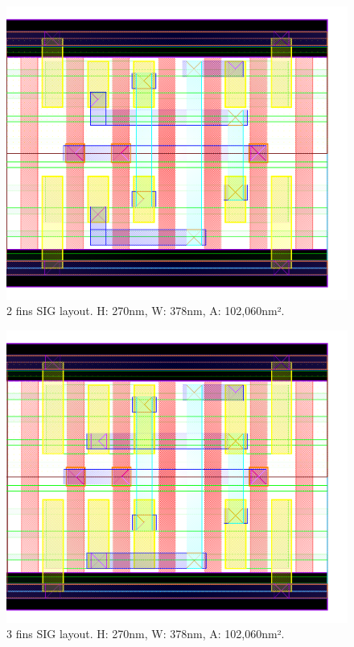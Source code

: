 \documentclass[pgmicro,diss,english]{iiufrgs}
\begin{document}
\begin{figure}[]
\centering
\includegraphics[width=\textwidth,height=\textheight,keepaspectratio]{SIG2F.png}
\caption{2 fins SIG layout. H: 270nm, W: 378nm, A: 102,060nm².}
\label{fig:SIG2F}
\end{figure}

\begin{figure}[]
\centering
\includegraphics[width=\textwidth,height=\textheight,keepaspectratio]{SIG3F.png}
\caption{3 fins SIG layout. H: 270nm, W: 378nm, A: 102,060nm².}
\label{fig:SIG3F}
\end{figure}
\end{document}
